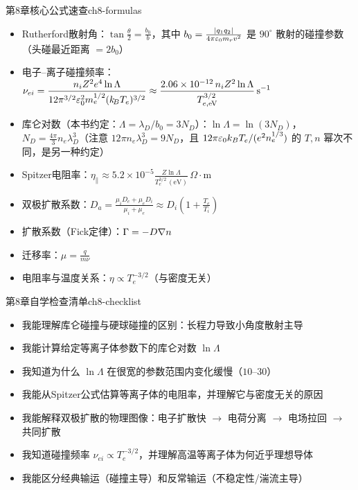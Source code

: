 \begin{formulabox}{第8章核心公式速查}{ch8-formulas}
\begin{itemize}[leftmargin=*,itemsep=0pt]
\item Rutherford散射角：$\displaystyle\tan\frac{\theta}{2} = \frac{b_0}{b}$，其中 $b_0 = \frac{|q_1 q_2|}{4\pi\varepsilon_0 m_r v^2}$ 是 $90^\circ$ 散射的碰撞参数（头碰最近距离 $=2b_0$）
\item 电子--离子碰撞频率：$\displaystyle\nu_{ei} = \frac{n_i Z^2 e^4 \ln\Lambda}{12\pi^{3/2}\varepsilon_0^2 m_e^{1/2}(k_{\!B}T_e)^{3/2}} \approx \frac{2.06\times10^{-12}\,n_iZ^2\ln\Lambda}{T_{e,\mathrm{eV}}^{3/2}}\,\mathrm{s^{-1}}$
\item 库仑对数（本书约定：$\Lambda=\lambda_D/b_0=3N_D$）：$\displaystyle\ln\Lambda = \ln(3N_D)$，$N_D = \tfrac{4\pi}{3}n_e\lambda_D^3$（注意 $12\pi n_e\lambda_D^3=9N_D$，且 $12\pi\varepsilon_0 k_BT_e/(e^2n_e^{1/3})$ 的 $T,n$ 幂次不同，是另一种约定）
\item Spitzer电阻率：$\displaystyle\eta_{\parallel} \approx 5.2\times 10^{-5}\frac{Z\ln\Lambda}{T_e^{3/2}\,\mathrm{(eV)}}\,\Omega\cdot\mathrm{m}$
\item 双极扩散系数：$\displaystyle D_a = \frac{\mu_i D_e + \mu_e D_i}{\mu_i + \mu_e} \approx D_i\left(1 + \frac{T_e}{T_i}\right)$
\item 扩散系数（Fick定律）：$\displaystyle\Gamma = -D\nabla n$
\item 迁移率：$\displaystyle\mu = \frac{q}{m\nu}$
\item 电阻率与温度关系：$\displaystyle\eta \propto T_e^{-3/2}$（与密度无关）
\end{itemize}
\end{formulabox}

\begin{checklistbox}{第8章自学检查清单}{ch8-checklist}
\begin{itemize}[leftmargin=*,label=$\square$]
\item 我能理解库仑碰撞与硬球碰撞的区别：长程力导致小角度散射主导
\item 我能计算给定等离子体参数下的库仑对数 $\ln\Lambda$
\item 我知道为什么 $\ln\Lambda$ 在很宽的参数范围内变化缓慢（$10$--$30$）
\item 我能从Spitzer公式估算等离子体的电阻率，并理解它与密度无关的原因
\item 我能解释双极扩散的物理图像：电子扩散快 $\to$ 电荷分离 $\to$ 电场拉回 $\to$ 共同扩散
\item 我知道碰撞频率 $\nu_{ei} \propto T_e^{-3/2}$，并理解高温等离子体为何近乎理想导体
\item 我能区分经典输运（碰撞主导）和反常输运（不稳定性/湍流主导）
\end{itemize}
\end{checklistbox}

\endinput
